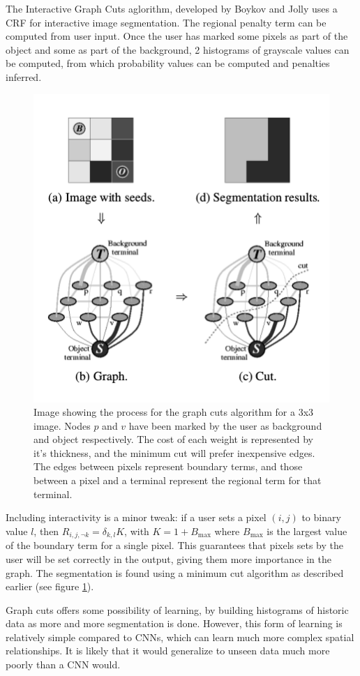 The Interactive Graph Cuts aglorithm, developed by Boykov and Jolly \cite{graphCuts} uses a CRF for interactive image segmentation. The regional penalty term can be computed from user input. Once the user has marked some pixels as part of the object and some as part of the background, 2 histograms of grayscale values can be computed, from which probability values can be computed and penalties inferred.

\begin{figure}[h!]
\centering
\includegraphics[scale=0.55]{pictures/graphCuts}
\caption{Image showing the process for the graph cuts algorithm for a 3x3 image. Nodes $p$ and $v$ have been marked by the user as background and object respectively. The cost of each weight is represented by it's thickness, and the minimum cut will prefer inexpensive edges. The edges between pixels represent boundary terms, and those between a pixel and a terminal represent the regional term for that terminal. \cite{graphCuts}}
\label{fig:graphCut}
\end{figure}

Including interactivity is a minor tweak: if a user sets a pixel $(i,j)$ to binary value $l$, then $R_{i,j,\neg k} = \delta_{k,l} K$, with $K = 1 + B _\text{max}$ where $B_{\text{max}}$ is the largest value of the boundary term for a single pixel. This guarantees that pixels sets by the user will be set correctly in the output, giving them more importance in the graph. The segmentation is found using a minimum cut algorithm as described earlier (see figure \ref{fig:graphCut}). 

Graph cuts offers some possibility of learning, by building histograms of historic data as more and more segmentation is done. However, this form of learning is relatively simple compared to CNNs, which can learn much more complex spatial relationships. It is likely that it would generalize to unseen data much more poorly than a CNN would.